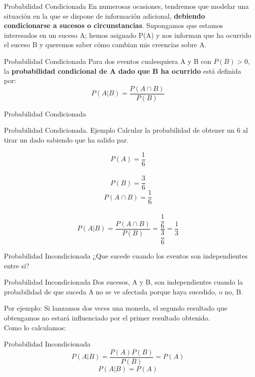 \documentclass[11pt]{beamer}
\begin{document}
        \begin{frame}{Probabilidad Condicionada}
          En numerosas ocasiones, tendremos que modelar una situación en la que se dispone de información adicional, \textbf{debiendo condicionarse a sucesos o circunstancias}. Supongamos que estamos interesados en un suceso A; hemos asignado P(A) y nos informan que ha ocurrido el suceso B y queremos saber cómo cambian mis creencias sobre A.
          \pause
          \begin{block}{Probabilidad Condicionada}
            Para dos eventos cualesquiera A y B con $P(B) >  0$, la \textbf{probabilidad condicional de A dado que B ha ocurrido} está definida por:
            $$ P(A|B)=\dfrac{P(A\cap B)}{P(B)}$$
          \end{block}

        \end{frame}

        \begin{frame}{Probabilidad Condicionada}

            \begin{block}{Probabilidad Condicionada. Ejemplo}
                Calcular la probabilidad de obtener un 6 al tirar un dado sabiendo que ha salido par.
             \end{block}
            \pause
            \begin{block}{}
                $$P(A)= \dfrac{1}{6} $$\\
                $$P(B)= \dfrac{3}{6}$$
                $$P(A\cap B) = \dfrac{1}{6}$$\\
                $$ P(A|B)=\dfrac{P(A\cap B)}{P(B)} = \dfrac{\dfrac{1}{6}}{\dfrac{3}{6}}=\dfrac{1}{3}$$
            \end{block}
        \end{frame}

        \begin{frame}{Probabilidad Incondicionada}
          ¿Que sucede cuando los eventos son independientes entre si?\\
          \pause
          \begin{block}{Probabilidad Incondicionada}
                      Dos sucesos, A y B, son independientes cuando la probabilidad de que suceda A no se ve afectada porque haya sucedido, o no, B.
          \end{block}
          Por ejemplo: Si lanzamos dos veces una moneda, el segundo resultado que obtengamos no estará influenciado por el primer resultado obtenido.\\
          Como lo calculamos:
          \pause
          \begin{block}{Probabilidad Incondicionada}
            $$ P(A|B)=\dfrac{P(A)P(B)}{P(B)}=P(A)$$
            $$ P(A|B)=P(A)$$
          \end{block}
    \end{frame}
\end{document}
